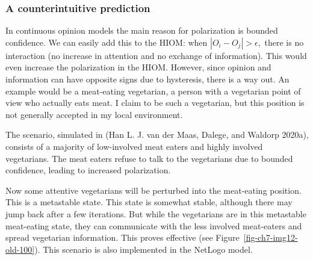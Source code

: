 \documentclass[
  a4paper,
  DIV=11,
  numbers=noendperiod]{scrreprt}
\begin{document}
\hypertarget{sec-A-counterintuitive-prediction}{%
\subsubsection{A counterintuitive
prediction}\label{sec-A-counterintuitive-prediction}}

In continuous opinion models the main reason for polarization is bounded
confidence. We can easily add this to the HIOM: when
\(\left| O_{i} - O_{j} \right| > \epsilon,\) there is no interaction (no
increase in attention and no exchange of information). This would even
increase the polarization in the HIOM. However, since opinion and
information can have opposite signs due to hysteresis, there is a way
out. An example would be a meat-eating vegetarian, a person with a
vegetarian point of view who actually eats meat. I claim to be such a
vegetarian, but this position is not generally accepted in my local
environment.

The scenario, simulated in (Han L. J. van der Maas, Dalege, and Waldorp
2020a), consists of a majority of low-involved meat eaters and highly
involved vegetarians. The meat eaters refuse to talk to the vegetarians
due to bounded confidence, leading to increased polarization.

Now some attentive vegetarians will be perturbed into the meat-eating
position. This is a metastable state. This state is somewhat stable,
although there may jump back after a few iterations. But while the
vegetarians are in this metastable meat-eating state, they can
communicate with the less involved meat-eaters and spread vegetarian
information. This proves effective (see
Figure~\ref{fig-ch7-img12-old-100}). This scenario is also implemented
in the NetLogo model.
\end{document}

